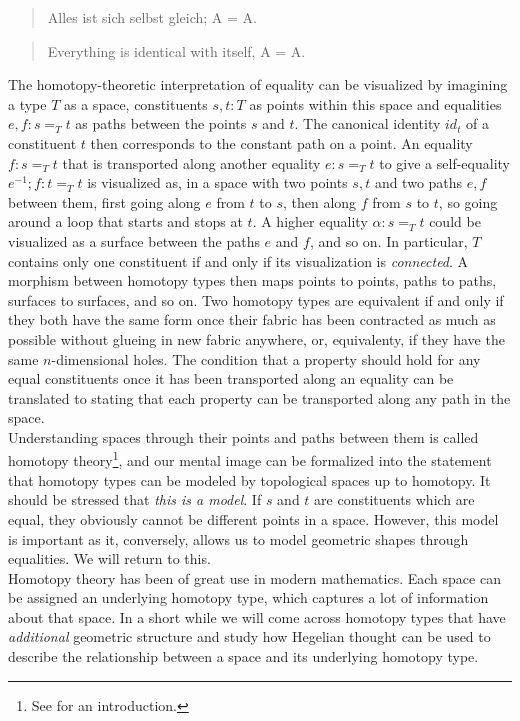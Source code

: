 \documentclass{article}
\begin{document}
\begin{quote}
    Alles ist sich selbst gleich; A = A.
\end{quote}

\begin{quote}
    Everything is identical with itself, A = A.
\end{quote}

The homotopy-theoretic interpretation of equality can be visualized by imagining a type $T$ as a space,
constituents $s,t:T$ as points within this space and equalities $e,f:s=_T t$ as paths between the points
$s$ and $t$. The canonical identity $id_t$ of a constituent $t$ then corresponds to the constant path
on a point. An equality $f:s =_T t$  that is transported along another equality $e:s =_T t$ to give a
self-equality $e^{-1};f:t=_T t$ is visualized as, in a space with two points $s,t$ and two paths $e,f$
between them, first going along $e$ from $t$ to $s$, then along $f$ from $s$ to $t$, so going around a
loop that starts and stops at $t$. A higher equality $\alpha:s=_T t$ could be visualized as a surface
between the paths $e$ and $f$, and so on. In particular, $T$ contains only one constituent if and only
if its visualization is \emph{connected}. A morphism between homotopy types then maps points to points,
paths to paths, surfaces to surfaces, and so on. Two homotopy types are equivalent if and only if they
both have the same form once their fabric has been contracted as much as possible without glueing in new
fabric anywhere, or, equivalenty, if they have the same $n$-dimensional holes. The condition that a property
should hold for any equal constituents once it has been transported along an equality can be translated
to stating that each property can be transported along any path in the space. \\

Understanding spaces through their points and paths between them is called homotopy theory\footnote{See
\cite{Htt} for an introduction.}, and our mental image can be formalized into the statement that homotopy
types can be modeled by topological spaces up to homotopy. It should be stressed that \emph{this is a
model}. If $s$ and $t$ are constituents which are equal, they obviously cannot be different points in
a space. However, this model is important as it, conversely, allows us to model geometric shapes through
equalities. We will return to this. \\

Homotopy theory has been of great use in modern mathematics. Each space can be assigned an underlying
homotopy type, which captures a lot of information about that space. In a short while we will come across
homotopy types that have \emph{additional} geometric structure and study how Hegelian thought can be used
to describe the relationship between a space and its underlying homotopy type. \\
\end{document}
